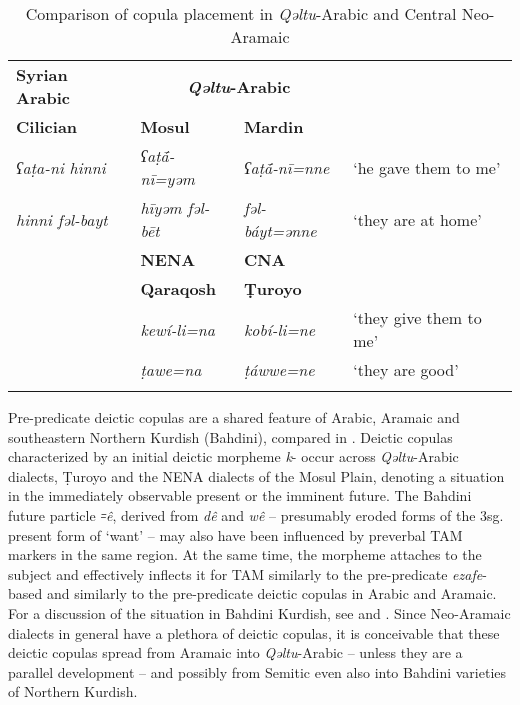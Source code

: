 \documentclass[output=paper,colorlinks,citecolor=brown,draftmode]{langscibook}
\begin{document}
\begin{table}[t]
    \begin{tabularx}{\textwidth}{XlXl}
\lsptoprule
\textbf{Syrian Arabic} & \multicolumn{2}{c}{\textbf{\textit{Qəltu}-Arabic}} & \\
\textbf{Cilician} & \textbf{Mosul} & \textbf{Mardin} \\
\midrule
\textit{ʕaṭa-ni hinni} & \textit{ʕaṭā́-nī=yəm} & \textit{ʕaṭā́-nī=nne} & `he gave them to me' \\
\textit{hinni fəl-bayt} & \textit{hīyəm fəl-bēt} & \textit{fəl-báyt=ənne} & `they are at home' \\
\midrule
& \textbf{NENA} & \textbf{CNA} & \\
& \textbf{Qaraqosh} & \textbf{Ṭuroyo} & \\
\midrule
& \textit{kewí-li=na} & \textit{kobí-li=ne} & `they give them to me' \\
& \textit{ṭawe=na} & \textit{ṭáwwe=ne} & `they are good' \\
\lspbottomrule
    \end{tabularx}
    \caption{Comparison of copula placement in \textit{Qəltu}-Arabic and Central Neo-Aramaic}
    \label{Arabic:tab:6}
\end{table}

\begin{sloppypar}
Pre-predicate deictic copulas are a shared feature of Arabic, Aramaic and southeastern Northern Kurdish (Bahdini), compared in . Deictic copulas characterized by an initial deictic morpheme \textit{k}- occur across \textit{Qəltu}-Arabic dialects, Ṭuroyo and the NENA dialects of the Mosul Plain, denoting a situation in the immediately observable present or the imminent future. The Bahdini future particle \textit{꞊ê}, derived from \textit{dê} and \textit{wê} -- presumably eroded forms of the 3sg. present form of `want' -- may also have been influenced by preverbal TAM markers in the same region. At the same time, the morpheme attaches to the subject  and effectively inflects it for TAM similarly to the pre-predicate \textit{ezafe}-based  and similarly to the pre-predicate deictic copulas in Arabic and Aramaic. For a discussion of the situation in Bahdini Kurdish, see \citet[247–249]{Chyet1995NAK} and \citet[405–407]{haig_western_2017}. Since Neo-Aramaic dialects in general have a plethora of deictic copulas, it is conceivable that these deictic copulas spread from Aramaic into \textit{Qəltu}-Arabic -- unless they are a parallel development -- and possibly from Semitic even also into Bahdini varieties of Northern Kurdish.
\end{sloppypar}
\end{document}
